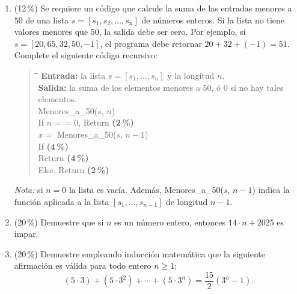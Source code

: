 \documentclass[11pt]{article}
\newenvironment{pseudo}{%
  \begin{quote}\ttfamily\small\begin{tabbing}
  \hspace{2em}\=\hspace{2em}\=\hspace{2em}\=\hspace{2em}\=\kill}{%
  \end{tabbing}\end{quote}}
\begin{document}
\begin{enumerate}
\item (12\,\%) Se requiere un código que calcule la suma de las entradas menores a $50$ de una lista $s = [s_1, s_2, \dots, s_n]$ de números enteros. Si la lista no tiene valores menores que $50$, la salida debe ser cero. Por ejemplo, si $s = [20, 65, 32, 50, -1]$, el programa debe retornar $20 + 32 + (-1) = 51$. Complete el siguiente código recursivo:
\begin{pseudo}
\textbf{Entrada:} la lista $s = [s_1, \dots, s_n]$ y la longitud $n$.\\
\textbf{Salida:} la suma de los elementos menores a $50$, ó $0$ si no hay tales elementos.\\[2pt]
Menores\_a\_50($s$, $n$)\\
\>If $n == 0$, Return \underline{\hspace{2cm}} \quad\textbf{(2\,\%)}\\
\>$x = $ Menores\_a\_50($s$, $n-1$)\\
\>If \underline{\hspace{3cm}} \quad\textbf{(4\,\%)}\\
\>\>Return \underline{\hspace{3cm}} \quad\textbf{(4\,\%)}\\
\>Else, Return \underline{\hspace{2cm}} \quad\textbf{(2\,\%)}
\end{pseudo}
\emph{Nota:} si $n = 0$ la lista es vacía. Además, Menores\_a\_50($s$, $n-1$) indica la función aplicada a la lista $[s_1, \dots, s_{n-1}]$ de longitud $n-1$.

\item (20\,\%) Demuestre que si $n$ es un número entero, entonces $14 \cdot n + 2025$ es impar.

\item (20\,\%) Demuestre empleando inducción matemática que la siguiente afirmación es válida para todo entero $n \geq 1$:
\[
(5 \cdot 3) + (5 \cdot 3^2) + \cdots + (5 \cdot 3^n) = \frac{15}{2}(3^n - 1).
\]
\end{enumerate}

\vfill
{}
\end{document}
